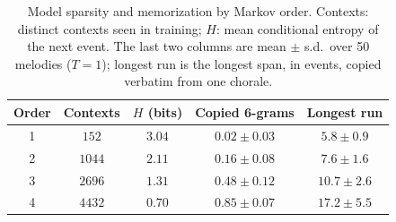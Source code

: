 \begin{table}[t]
  \centering
  \small
  \setlength{\tabcolsep}{4pt}
  \begin{tabular}{ccccc}
    \toprule
    Order & Contexts & $H$ (bits) & Copied 6-grams & Longest run \\
    \midrule
    1 & $152$ & $3.04$ & $0.02 \pm 0.03$ & $5.8 \pm 0.9$ \\
    2 & $1044$ & $2.11$ & $0.16 \pm 0.08$ & $7.6 \pm 1.6$ \\
    3 & $2696$ & $1.31$ & $0.48 \pm 0.12$ & $10.7 \pm 2.6$ \\
    4 & $4432$ & $0.70$ & $0.85 \pm 0.07$ & $17.2 \pm 5.5$ \\
    \bottomrule
  \end{tabular}
  \caption{Model sparsity and memorization by Markov order. Contexts: distinct contexts seen in training; $H$: mean conditional entropy of the next event. The last two columns are mean $\pm$ s.d.\ over 50 melodies ($T = 1$); longest run is the longest span, in events, copied verbatim from one chorale.}
  \label{tab:results}
\end{table}
